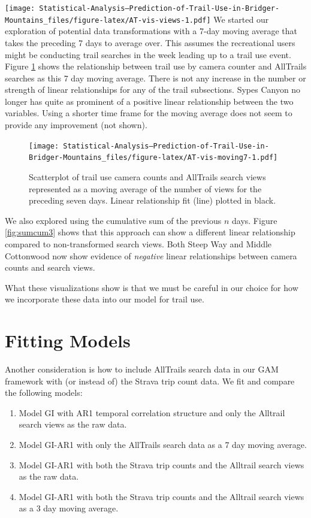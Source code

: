 \documentclass[
]{book}
\providecommand{\tightlist}{%
  \setlength{\itemsep}{0pt}\setlength{\parskip}{0pt}}
\begin{document}
\texttt{[image: Statistical-Analysis--Prediction-of-Trail-Use-in-Bridger-Mountains\_files/figure-latex/AT-vis-views-1.pdf]}
We started our exploration of potential data transformations with a 7-day moving average that takes the preceding 7 days to average over. This assumes the recreational users might be conducting trail searches in the week leading up to a trail use event. Figure \ref{fig:AT-vis-moving7} shows the relationship between trail use by camera counter and AllTrails searches as this 7 day moving average. There is not any increase in the number or strength of linear relationships for any of the trail subsections. Sypes Canyon no longer has quite as prominent of a positive linear relationship between the two variables. Using a shorter time frame for the moving average does not seem to provide any improvement (not shown).

\begin{figure}
\centering
\texttt{[image: Statistical-Analysis--Prediction-of-Trail-Use-in-Bridger-Mountains\_files/figure-latex/AT-vis-moving7-1.pdf]}
\caption{\label{fig:AT-vis-moving7}Scatterplot of trail use camera counts and AllTrails search views represented as a moving average of the number of views for the preceding seven days. Linear relationship fit (line) plotted in black.}
\end{figure}

We also explored using the cumulative sum of the previous \(n\) days. Figure \ref{fig:sumcum3} shows that this approach can show a different linear relationship compared to non-transformed search views. Both Steep Way and Middle Cottonwood now show evidence of \emph{negative} linear relationships between camera counts and search views.

What these visualizations show is that we must be careful in our choice for how we incorporate these data into our model for trail use.

\hypertarget{fitting-models}{%
\section{Fitting Models}\label{fitting-models}}

Another consideration is how to include AllTrails search data in our GAM framework with (or instead of) the Strava trip count data. We fit and compare the following models:

\begin{enumerate}
\def\labelenumi{\arabic{enumi}.}
\tightlist
\item
  Model GI with AR1 temporal correlation structure and only the Alltrail search views as the raw data.
\item
  Model GI-AR1 with only the AllTrails search data as a 7 day moving average.
\item
  Model GI-AR1 with both the Strava trip counts and the Alltrail search views as the raw data.
\item
  Model GI-AR1 with both the Strava trip counts and the Alltrail search views as a 3 day moving average.
\end{enumerate}
\end{document}
